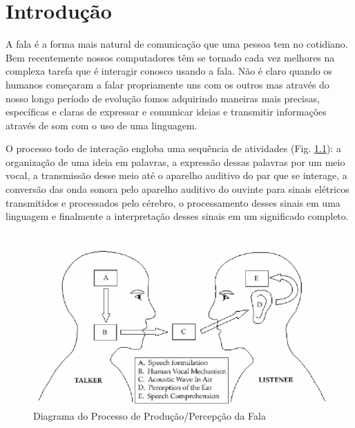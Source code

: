 \chapter{Introdução}
\label{cap:introducao}

A fala é a forma mais natural de comunicação que uma pessoa tem no cotidiano.
Bem recentemente nossos computadores têm se tornado cada vez melhores na complexa tarefa que é interagir conosco usando a fala. 
Não é claro quando os humanos começaram a falar propriamente uns com os outros mas através do nosso longo período de evolução fomos adquirindo maneiras mais precisas, específicas e claras de expressar e comunicar ideias e transmitir informações através de som com o uso de uma linguagem.

O processo todo de interação engloba uma sequência de atividades (Fig. \ref{fig:processo_de_fala}): a organização de uma ideia em palavras, a expressão dessas palavras por um meio vocal, a transmissão desse meio até o aparelho auditivo do par que se interage, a conversão das onda sonora pelo aparelho auditivo do ouvinte para sinais elétricos transmitidos e processados pelo cérebro, o processamento desses sinais em uma linguagem e finalmente a interpretação desses sinais em um significado completo.

\begin{figure}
	\centering
	\includegraphics[width=\textwidth]{figuras/processo_de_fala.png}
	\caption[Diagrama do Processo de Produção/Percepção da Fala]{Diagrama do Processo de Produção/Percepção da Fala \cite{speech_process}}
	\label{fig:processo_de_fala}
\end{figure}

